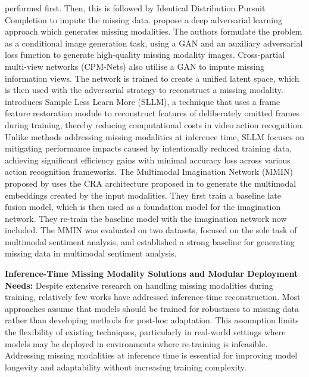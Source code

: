 performed first. Then, this is followed by Identical Distribution Pursuit Completion to impute the missing data. \citet{10.1145/3219819.3219963} propose a deep adversarial learning approach which generates missing modalities. The authors formulate the problem as a conditional image generation task, using a GAN and an auxiliary adversarial loss function to generate high-quality missing modality images. Cross-partial multi-view networks (CPM-Nets) \cite{9258396} also utilise a GAN to impute missing information views. The network is trained to create a unified latent space, which is then used with the adversarial strategy to reconstruct a missing modality. \citet{10.1145/3581783.3611696} introduces Sample Less Learn More (SLLM), a technique that uses a frame feature restoration module to reconstruct features of deliberately omitted frames during training, thereby reducing computational costs in video action recognition. Unlike methods addressing missing modalities at inference time, SLLM focuses on mitigating performance impacts caused by intentionally reduced training data, achieving significant efficiency gains with minimal accuracy loss across various action recognition frameworks. The Multimodal Imagination Network (MMIN) proposed by \citet{zhao-etal-2021-missing} uses the CRA architecture proposed in \cite{Tran_2017_CVPR} to generate the multimodal embeddings created by the input modalities. They first train a baseline late fusion model, which is then used as a foundation model for the imagination network. They re-train the baseline model with the imagination network now included. The MMIN was evaluated on two datasets, focused on the sole task of multimodal sentiment analysis, and established a strong baseline for generating missing data in multimodal sentiment analysis. 

\textbf{Inference-Time Missing Modality Solutions and Modular Deployment Needs: } Despite extensive research on handling missing modalities during training, relatively few works have addressed inference-time reconstruction. Most approaches assume that models should be trained for robustness to missing data rather than developing methods for post-hoc adaptation. This assumption limits the flexibility of existing techniques, particularly in real-world settings where models may be deployed in environments where re-training is infeasible. Addressing missing modalities at inference time is essential for improving model longevity and adaptability without increasing training complexity.

